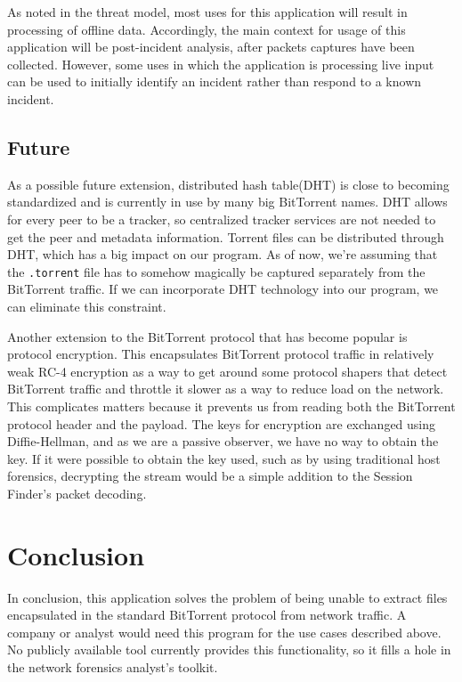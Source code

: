 \documentclass{acm_proc_article-sp}
\begin{document}
As noted in the threat model, most uses for this application will result in
processing of offline data. Accordingly, the main context for usage of this
application will be post-incident analysis, after packets captures have been
collected. However, some uses in which the application is processing live input
can be used to initially identify an incident rather than respond to a known
incident.

\subsection{Future}
As a possible future extension, distributed hash table(DHT) is close to
becoming standardized and is currently in use by many big BitTorrent names.  DHT
allows for every peer to be a tracker, so centralized tracker services are not
needed to get the peer and metadata information. Torrent files can be
distributed through DHT, which has a big impact on our program.  As of now,
we're assuming that the \texttt{.torrent} file has to somehow magically be captured
separately from the BitTorrent traffic.  If we can incorporate DHT technology
into our program, we can eliminate this constraint.

Another extension to the BitTorrent protocol that has become popular is protocol
encryption.  This encapsulates BitTorrent protocol traffic in relatively weak
RC-4 encryption as a way to get around some protocol shapers that detect
BitTorrent traffic and throttle it slower as a way to reduce load on the
network. This complicates matters because it prevents us from reading both the
BitTorrent protocol header and the payload. The keys for encryption are
exchanged using Diffie-Hellman, and as we are a passive observer, we have no way
to obtain the key.  If it were possible to obtain the key used, such as by using
traditional host forensics, decrypting the stream would be a simple addition to
the Session Finder's packet decoding.

\section{Conclusion}
In conclusion, this application solves the problem of being unable to extract
files encapsulated in the standard BitTorrent protocol from network traffic.  A
company or analyst would need this program for the use cases described above.
No publicly available tool currently provides this functionality, so it fills a
hole in the network forensics analyst's toolkit.

\nocite{*}


\end{document}
